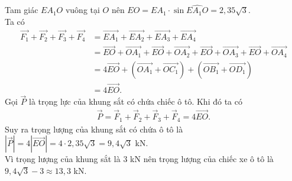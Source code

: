 \begin{ex}
{Tam giác $EA_1O$ vuông tại $O$ nên $EO=EA_1\cdot\sin\widehat{EA_1O}=2{,}35\sqrt{3}$.\\
Ta có
\begin{align*}
\overrightarrow{F_1}+\overrightarrow{F_2}+\overrightarrow{F_3}+\overrightarrow{F_4}&=\overrightarrow{EA_1}+\overrightarrow{EA_2}+\overrightarrow{EA_3}+\overrightarrow{EA_4}\\
&=\overrightarrow{EO}+\overrightarrow{OA_1}+\overrightarrow{EO}+\overrightarrow{OA_2}+\overrightarrow{EO}+\overrightarrow{OA_3}+\overrightarrow{EO}+\overrightarrow{OA_4}\\
&=4\overrightarrow{EO}+\left(\overrightarrow{OA_1}+\overrightarrow{OC_1}\right)+\left(\overrightarrow{OB_1}+\overrightarrow{OD_1}\right)\\
&=4\overrightarrow{EO}.
\end{align*}
Gọi $\overrightarrow{P}$ là trọng lực của khung sắt có chứa chiếc ô tô. Khi đó ta có 
\begin{align*}
 \overrightarrow{P} = \overrightarrow{F}_1 + \overrightarrow{F}_2 + \overrightarrow{F}_3 + \overrightarrow{F}_4 = 4\overrightarrow{EO}.
\end{align*}
Suy ra trọng lượng của khung sắt có chứa ô tô là $\left|\overrightarrow{P}\right| = 4\left\vert\overrightarrow{EO}\right\vert=4\cdot2{,}35\sqrt{3}=9{,}4\sqrt{3}$ kN.\\
Vì trọng lượng của khung sắt là $3$ kN nên trọng lượng của chiếc xe ô tô là $9{,}4\sqrt{3}-3\approx13{,}3$ kN.
}
\end{ex}
 

